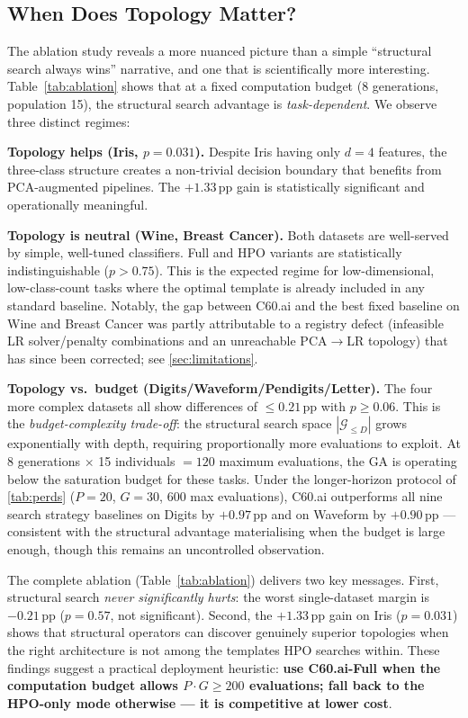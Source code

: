 \documentclass{article}
\theoremstyle{definition}
\theoremstyle{plain}
\theoremstyle{remark}
\begin{document}
\subsection{When Does Topology Matter?}

The ablation study reveals a more nuanced picture than a simple
``structural search always wins'' narrative, and one that is scientifically
more interesting.
Table~\ref{tab:ablation} shows that at a fixed computation budget
(8 generations, population 15), the structural search advantage is
\emph{task-dependent}.
We observe three distinct regimes:

\textbf{Topology helps (Iris, $p{=}0.031$).}
Despite Iris having only $d{=}4$ features, the three-class structure
creates a non-trivial decision boundary that benefits from PCA-augmented
pipelines.
The $+1.33$\,pp gain is statistically significant and operationally
meaningful.

\textbf{Topology is neutral (Wine, Breast Cancer).}
Both datasets are well-served by simple, well-tuned classifiers.
Full and HPO variants are statistically indistinguishable ($p > 0.75$).
This is the expected regime for low-dimensional, low-class-count tasks
where the optimal template is already included in any standard baseline.
Notably, the gap between C60.ai and the best fixed baseline on Wine and
Breast Cancer was partly attributable to a registry defect (infeasible
LR solver/penalty combinations and an unreachable \textsc{PCA}$\to$LR
topology) that has since been corrected; see \cref{sec:limitations}.

\textbf{Topology vs.\ budget (Digits/Waveform/Pendigits/Letter).}
The four more complex datasets all show differences of $\leq 0.21$\,pp
with $p \geq 0.06$.
This is the \emph{budget-complexity trade-off}: the structural search
space $|\mathcal{G}_{\leq D}|$ grows exponentially with depth, requiring
proportionally more evaluations to exploit.
At 8 generations $\times$ 15 individuals $= 120$ maximum evaluations,
the GA is operating below the saturation budget for these tasks.
Under the longer-horizon protocol of \cref{tab:perds} ($P{=}20$,
$G{=}30$, 600 max evaluations), C60.ai outperforms all nine search
strategy baselines on Digits by $+0.97$\,pp and on Waveform by $+0.90$\,pp —
consistent with the structural advantage materialising when the budget
is large enough, though this remains an uncontrolled observation.

The complete ablation (Table~\ref{tab:ablation}) delivers two
key messages.
First, structural search \emph{never significantly hurts}: the worst
single-dataset margin is $-0.21$\,pp ($p{=}0.57$, not significant).
Second, the $+1.33$\,pp gain on Iris ($p{=}0.031$) shows that
structural operators can discover genuinely superior topologies when
the right architecture is not among the templates HPO searches within.
These findings suggest a practical deployment heuristic:
\textbf{use C60.ai-Full when the computation budget allows $P \cdot G
\geq 200$ evaluations; fall back to the HPO-only mode otherwise — it
is competitive at lower cost}.
\end{document}
